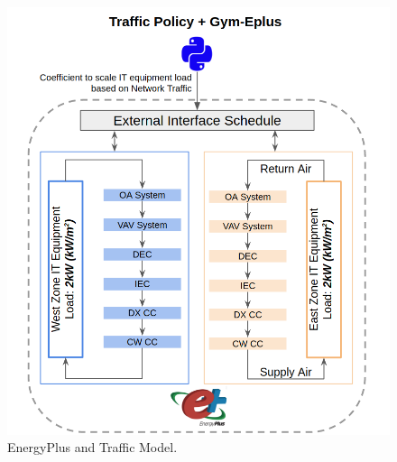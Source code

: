 \begin{figure} [!h]
\centering
\includegraphics[scale=.25]{building_energy_model/TowardsEstimatingtheEcologicalCostsofInternetServices/paper_latex/img/python_eplus.png}
\caption[EnergyPlus and Traffic Model.]{EnergyPlus and Traffic Model.}
\label{img_ep_py}
\end{figure}